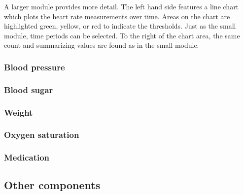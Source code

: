         A larger module provides more detail. The left hand side features a line chart which plots the heart rate measurements over time. Areas on the chart are highlighted green, yellow, or red to indicate the thresholds. Just as the small module, time periods can be selected. To the right of the chart area, the same count and summarizing values are found as in the small module.


        \subsubsection{Blood pressure}


        \subsubsection{Blood sugar}


        \subsubsection{Weight}

        
        \subsubsection{Oxygen saturation}


        \subsubsection{Medication}


    \subsection{Other components}

